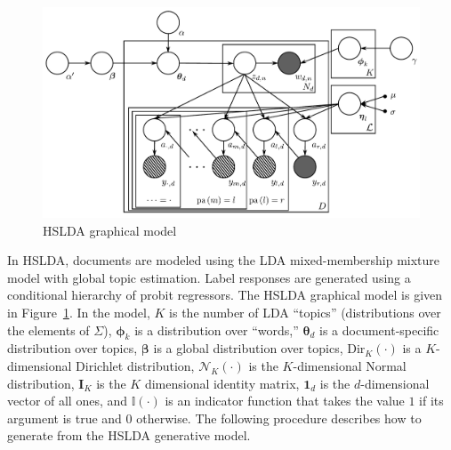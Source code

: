 %
\begin{figure}[t]
 \centering \includegraphics[scale=0.4]{Graphical_Model-final} \caption{HSLDA graphical model}


\label{fig:graphical_model} 
\end{figure}

In HSLDA, documents are modeled using the LDA mixed-membership mixture model
with global topic estimation. Label responses are generated using a conditional
hierarchy of probit regressors. The HSLDA graphical model is given in
Figure~\ref{fig:graphical_model}. In the model, $K$ is the number of LDA
``topics'' (distributions over the elements of $\Sigma$), $\boldsymbol\phi_k$
is a distribution over ``words,'' $\boldsymbol\theta_d$ is a document-specific
distribution over topics, $\boldsymbol\beta$ is a global distribution over
topics, Dir$_{K}(\cdot)$ is a $K$-dimensional Dirichlet distribution,
$\mathcal{N}_{K}(\cdot)$ is the $K$-dimensional Normal distribution,
$\mathbf{I}_{K}$ is the $K$ dimensional identity matrix,  $\mathbf{1}_d$ is the
$d$-dimensional vector of all ones, and $\mathbb{I}(\cdot)$ is an indicator
function that takes the value $1$ if its argument is true and $0$ otherwise.
The following procedure describes how to generate from the HSLDA generative
model.




